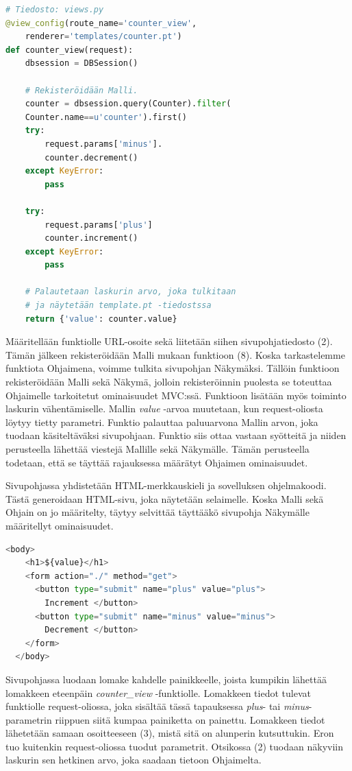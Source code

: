 \documentclass[utf8]{gradu3}
\begin{document}
\begin{lstlisting}[language=Python]
# Tiedosto: views.py
@view_config(route_name='counter_view',
	renderer='templates/counter.pt')
def counter_view(request):
    dbsession = DBSession()

    # Rekisteröidään Malli.
    counter = dbsession.query(Counter).filter(
	Counter.name==u'counter').first()
    try:
        request.params['minus'].
        counter.decrement()
    except KeyError:
        pass

    try:
        request.params['plus']
        counter.increment()
    except KeyError:
        pass

    # Palautetaan laskurin arvo, joka tulkitaan
    # ja näytetään template.pt -tiedostssa
    return {'value': counter.value}
\end{lstlisting}
Määritellään funktiolle URL-osoite sekä liitetään siihen sivupohjatiedosto (2). Tämän jälkeen rekisteröidään Malli mukaan funktioon (8). Koska tarkastelemme funktiota Ohjaimena, voimme tulkita sivupohjan Näkymäksi. Tällöin funktioon rekisteröidään Malli sekä Näkymä, jolloin rekisteröinnin puolesta se toteuttaa Ohjaimelle tarkoitetut ominaisuudet MVC:ssä. Funktioon lisätään myös toiminto laskurin vähentämiselle. Mallin \emph{value} -arvoa muutetaan, kun request-oliosta löytyy tietty parametri. Funktio palauttaa paluuarvona Mallin arvon, joka tuodaan käsiteltäväksi sivupohjaan. Funktio siis ottaa vastaan syötteitä ja niiden perusteella lähettää viestejä
Mallille sekä Näkymälle. Tämän perusteella todetaan, että se täyttää rajauksessa määrätyt Ohjaimen ominaisuudet. 

Sivupohjassa yhdistetään HTML-merkkauskieli ja sovelluksen ohjelmakoodi. Tästä generoidaan HTML-sivu, joka näytetään selaimelle. Koska Malli sekä Ohjain on jo määritelty, täytyy selvittää täyttääkö sivupohja Näkymälle määritellyt ominaisuudet.
\begin{lstlisting}[language=Python]
  <body>
    <h1>${value}</h1>
    <form action="./" method="get">
      <button type="submit" name="plus" value="plus">
		Increment </button>
      <button type="submit" name="minus" value="minus"> 
		Decrement </button>
    </form>
  </body>
\end{lstlisting}
Sivupohjassa luodaan lomake kahdelle painikkeelle, joista kumpikin lähettää lomakkeen eteenpäin \emph{counter\_view} -funktiolle. Lomakkeen tiedot tulevat funktiolle request-oliossa, joka sisältää tässä tapauksessa \emph{plus}- tai \emph{minus}-parametrin riippuen siitä kumpaa painiketta on painettu. Lomakkeen tiedot lähetetään samaan osoitteeseen (3), mistä sitä on alunperin kutsuttukin. Eron tuo kuitenkin request-oliossa tuodut parametrit.  Otsikossa (2) tuodaan näkyviin laskurin sen hetkinen arvo, joka saadaan tietoon Ohjaimelta.
\end{document}
